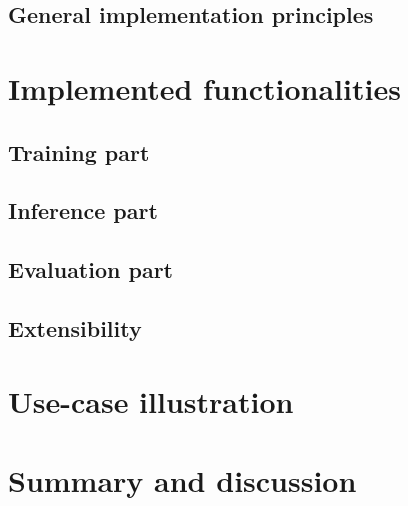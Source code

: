 \documentclass[article]{jss}
\begin{document}
\subsection{General implementation principles}
\label{subsec:general_design}


\section{Implemented functionalities}


\subsection{Training part}
\label{subsec:training}


\subsection{Inference part}
\label{subsec:inference}


\subsection{Evaluation part}
\label{subsec:evaluation}


\subsection{Extensibility} %
\label{subsec:extensibility}


\section{Use-case illustration}


\section{Summary and discussion} \label{sec:summary}


\end{document}
